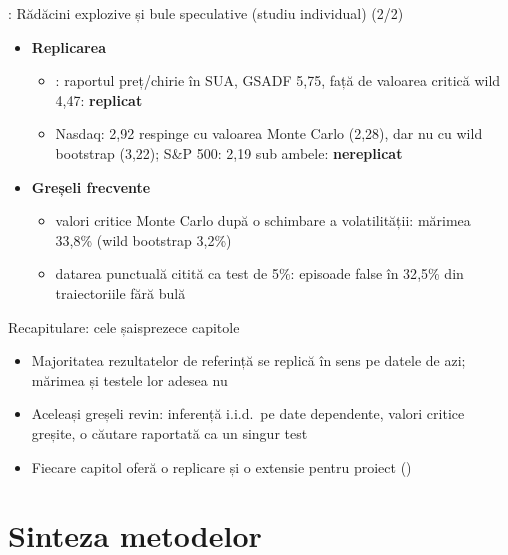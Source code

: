 \begin{frame}{: Rădăcini explozive și bule speculative (studiu individual) (2/2)}
\itemsize{\small}
\begin{itemize}
    \item \textbf{Replicarea}
    \begin{itemize}
        \item {}: raportul preț/chirie în SUA, GSADF 5{,}75, față de valoarea critică wild 4{,}47: \textbf{replicat}
        \item {} Nasdaq: 2{,}92 respinge cu valoarea Monte Carlo (2{,}28), dar nu cu wild bootstrap (3{,}22);  S\&P 500: 2{,}19 sub ambele: \textbf{nereplicat}
    \end{itemize}
    \item \textbf{Greșeli frecvente}
    \begin{itemize}
        \item valori critice Monte Carlo după o schimbare a volatilității: mărimea 33{,}8\% (wild bootstrap 3{,}2\%)
        \item datarea punctuală citită ca test de 5\%: episoade false în 32{,}5\% din traiectoriile fără bulă
    \end{itemize}
\end{itemize}
\end{frame}

\begin{frame}{Recapitulare: cele șaisprezece capitole}
\itemsize{\small}
\begin{itemize}
    \item Majoritatea rezultatelor de referință se replică în sens pe datele de azi; mărimea și testele lor adesea nu
    \item Aceleași greșeli revin: inferență i.i.d.\ pe date dependente, valori critice greșite, o căutare raportată ca un singur test
    \item Fiecare capitol oferă o replicare și o extensie pentru proiect ()
\end{itemize}
\end{frame}


\section{Sinteza metodelor}

